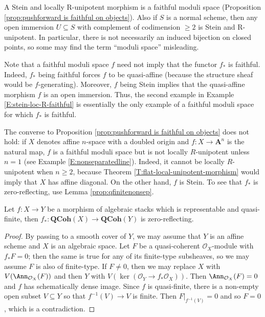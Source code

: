 \documentclass[reqno,a4paper]{amsart}
\numberwithin{Theorem}{section}
\newcommand{\Orb}{\mathcal{O}}
\newcommand{\QCoh}{\mathbf{QCoh}}
\theoremstyle{plain}
\theoremstyle{remark}
\begin{document}
\begin{Example}\label{E:stein-loc-R-faithful}
  A Stein and locally R-unipotent morphism is a faithful moduli space
  (Proposition \ref{prop:pushforward is faithful on objects}). Also if
  $S$ is a normal scheme, then any open immersion $U \subseteq S$ with
  complement of codimension $\geq 2$ is Stein and R-unipotent. In
  particular, there is not necessarily an induced bijection on closed
  points, so some may find the term ``moduli space'' misleading.
\end{Example}

\begin{remark}\label{rem:faithfulnotfaithful}
  Note that a faithful moduli space $f$ need not imply that the
  functor $f_*$ is faithful. Indeed, $f_*$ being faithful forces $f$
  to be quasi-affine (because the structure sheaf would be
  $f$-generating). Moreover, $f$ being Stein implies that the quasi-affine
  morphism $f$ is an open immersion. Thus, the second example in
  Example \ref{E:stein-loc-R-faithful} is essentially the only example
  of a faithful moduli space for which $f_*$ is faithful.
\end{remark}

 \begin{remark}
   The converse to Proposition \ref{prop:pushforward is faithful on
     objects} does not hold: if $X$ denotes affine $n$-space with a
   doubled origin and $f\colon X \to \mathbf{A}^n$ is the natural map,
   $f$ is a faithful moduli space but is not locally $R$-unipotent
   unless $n=1$ (see Example \ref{E:nonseparatedline}). Indeed, it
   cannot be locally $R$-unipotent when $n \geq 2$, because Theorem
   \ref{T:flat-local-unipotent-morphism} would imply that $X$ has
   affine diagonal. On the other hand, $f$ is Stein. To see that $f_*$ is
   zero-reflecting, use Lemma \ref{prop:qfinitenonsep}.
 \end{remark}

 \begin{lemma}\label{prop:qfinitenonsep}
   Let $f\colon X \to Y$ be a
   morphism of algebraic stacks which is representable and
   quasi-finite, then $f_*\colon \QCoh(X) \to \QCoh(Y)$ is
   zero-reflecting.
 \end{lemma}
 \begin{proof}
   By passing to a smooth cover of $Y$, we may assume that $Y$ is an
   affine scheme and $X$ is an algebraic space. Let $F$ be a
   quasi-coherent $\Orb_X$-module with $f_*F=0$; then the same is true
   for any of its finite-type subsheaves, so we may assume $F$ is also of
   finite-type. If $F \neq 0$, then we may replace $X$ with
   $V(\Ann_{\Orb_X}(F))$ and then $Y$ with
   $V(\ker(\Orb_Y \to f_*\Orb_X))$. Then 
   $\Ann_{\Orb_X}(F) = 0$ and $f$ has schematically dense image. Since
   $f$ is quasi-finite, there is a non-empty open subset
   $V \subseteq Y$ so that $f^{-1}(V) \to V$ is finite. Then
   $F|_{f^{-1}(V)}=0$ and so $F=0$, which is a
   contradiction.
 \end{proof}
\end{document}
